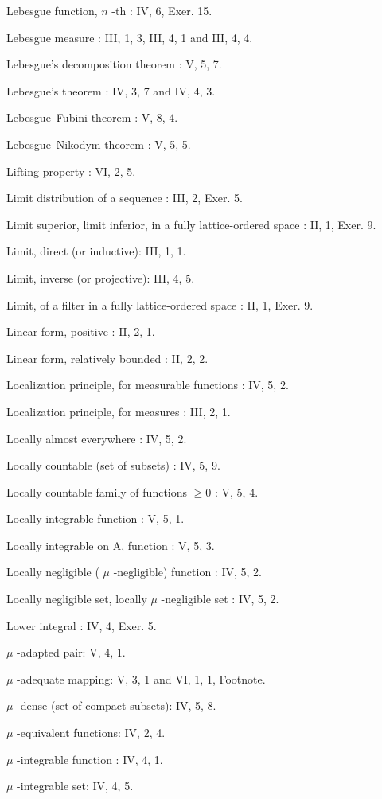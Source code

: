 Lebesgue function, \(n\) -th : IV, 6, Exer. 15.

Lebesgue measure : III, 1, 3, III, 4, 1 and III, 4, 4.

Lebesgue's decomposition theorem : V, 5, 7.

Lebesgue's theorem : IV, 3, 7 and IV, 4, 3.

Lebesgue--Fubini theorem : V, 8, 4.

Lebesgue--Nikodym theorem : V, 5, 5.

Lifting property : VI, 2, 5.

Limit distribution of a sequence : III, 2, Exer. 5.

Limit superior, limit inferior, in a fully lattice-ordered space : II, 1, Exer. 9.

Limit, direct (or inductive): III, 1, 1.

Limit, inverse (or projective): III, 4, 5.

Limit, of a filter in a fully lattice-ordered space : II, 1, Exer. 9.

Linear form, positive : II, 2, 1.

Linear form, relatively bounded : II, 2, 2.

Localization principle, for measurable functions : IV, 5, 2.

Localization principle, for measures : III, 2, 1.

Locally almost everywhere : IV, 5, 2.

Locally countable (set of subsets) : IV, 5, 9.

Locally countable family of functions \(\geqslant 0\) : V, 5, 4.

Locally integrable function : V, 5, 1.

Locally integrable on A, function : V, 5, 3.

Locally negligible ( \(\mu\) -negligible) function : IV, 5, 2.

Locally negligible set, locally \(\mu\) -negligible set : IV, 5, 2.

Lower integral : IV, 4, Exer. 5.

\(\mu\) -adapted pair: V, 4, 1.

\(\mu\) -adequate mapping: V, 3, 1 and VI, 1, 1, Footnote.

\(\mu\) -dense (set of compact subsets): IV, 5, 8.

\(\mu\) -equivalent functions: IV, 2, 4.

\(\mu\) -integrable function : IV, 4, 1.

\(\mu\) -integrable set: IV, 4, 5.

